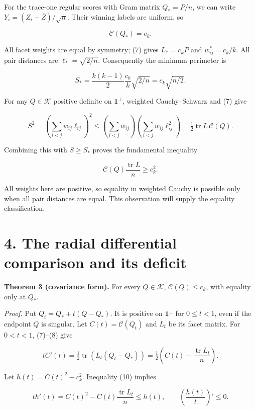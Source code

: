 \documentclass[11pt]{article}
\begin{document}
For the trace-one regular scores with Gram matrix \(Q_*=P/n\), we can
write \(Y_i=(Z_i-\overline Z)/\sqrt n\). Their winning labels are
uniform, so

\[
 \mathcal C(Q_*)=c_k.
\]

All facet weights are equal by symmetry; (7) gives \(L_*=c_kP\) and
\(w_{ij}^*=c_k/k\). All pair distances are \(\ell_* =\sqrt{2/n}\).
Consequently the minimum perimeter is

\[
 S_* =\frac{k(k-1)}2\frac{c_k}k\sqrt{2/n}
              =c_k\sqrt{n/2}.                            \tag{9}
\]

For any \(Q\in\mathcal K\) positive definite on \(\mathbf1^\perp\),
weighted Cauchy--Schwarz and (7) give

\[
 S^2=\left(\sum_{i<j}w_{ij}\ell_{ij}\right)^2
 \le\left(\sum_{i<j}w_{ij}\right)
        \left(\sum_{i<j}w_{ij}\ell_{ij}^2\right)
 =\tfrac12\operatorname{tr}L\,\mathcal C(Q).
\]

Combining this with \(S\ge S_*\) proves the fundamental inequality

\[
 \mathcal C(Q)\frac{\operatorname{tr}L}{n}\ge c_k^2.       \tag{10}
\]

All weights here are positive, so equality in weighted Cauchy is
possible only when all pair distances are equal. This observation will
supply the equality classification.

\section{4. The radial differential comparison and its
deficit}\label{the-radial-differential-comparison-and-its-deficit}

\textbf{Theorem 3 (covariance form).} For every \(Q\in\mathcal K\),
\(\mathcal C(Q)\le c_k\), with equality only at \(Q_*\).

\emph{Proof.} Put \(Q_t=Q_*+t(Q-Q_*)\). It is positive on
\(\mathbf1^\perp\) for \(0\le t<1\), even if the endpoint \(Q\) is
singular. Let \(C(t)=\mathcal C(Q_t)\) and \(L_t\) be its facet matrix.
For \(0<t<1\), (7)--(8) give

\[
 tC'(t)=\tfrac12\operatorname{tr}(L_t(Q_t-Q_*))
       =\tfrac12\left(C(t)-\frac{\operatorname{tr}L_t}{n}\right).
                                                               \tag{11}
\]

Let \(h(t)=C(t)^2-c_k^2\). Inequality (10) implies

\[
 th'(t)=C(t)^2-C(t)\frac{\operatorname{tr}L_t}{n}
       \le h(t),\qquad
 \left(\frac{h(t)}t\right)'\le0.                         \tag{12}
\]
\end{document}
